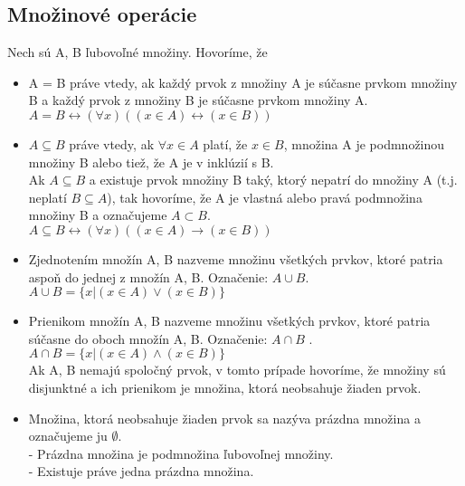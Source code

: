   \subsection*{Množinové operácie}
  Nech sú A, B ľubovoľné množiny.
  Hovoríme, že
  \begin{itemize}
    \item A = B práve vtedy, ak každý prvok z množiny A je súčasne prvkom množiny B a každý prvok z množiny B je súčasne prvkom množiny A. \\
    $A = B \leftrightarrow  (\forall x)((x \in A) \leftrightarrow  (x \in B))$\\

    \item $A \subseteq B$ práve vtedy, ak $\forall x \in A$ platí, že $x \in B$, množina A je podmnožinou množiny B alebo tiež, že A je v inklúzií s B. \\
    Ak $A \subseteq B$ a existuje prvok množiny B taký, ktorý nepatrí do množiny A (t.j. neplatí $B \subseteq A$), tak hovoríme, že A je vlastná alebo pravá podmnožina množiny B a označujeme $A \subset B$.\\
    $A \subseteq B \leftrightarrow  (\forall x)(( x\in A) \rightarrow ( x\in B))$\\

    \item Zjednotením množín A, B nazveme množinu všetkých prvkov, ktoré patria aspoň do jednej z množín A, B. Označenie: $A \cup B$.\\
    $A \cup B = \{ x | ( x \in A) \vee ( x \in B )\}$ \\

    \item Prienikom množín A, B nazveme množinu všetkých prvkov, ktoré patria súčasne do oboch množín A, B. Označenie: $A \cap B$ .\\
    $A \cap B = \{ x | ( x \in A) \wedge ( x \in B)\} $\\
    Ak A, B nemajú spoločný prvok, v tomto prípade hovoríme, že množiny sú disjunktné a ich prienikom je množina, ktorá neobsahuje žiaden prvok.\\

    \item Množina, ktorá neobsahuje žiaden prvok sa nazýva prázdna množina a označujeme ju $\emptyset$.\\ 
      - Prázdna množina je podmnožina ľubovoľnej množiny. \\
      - Existuje práve jedna prázdna množina. \\


\end{itemize}
